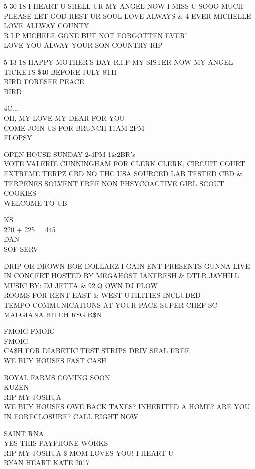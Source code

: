 \documentclass[10pt,letterpaper]{article}
\begin{document}
5{-}30{-}18 I HEART U SHELL UR MY ANGEL NOW I MISS U SOOO MUCH PLEASE LET GOD REST UR SOUL LOVE ALWAYS \& 4{-}EVER MICHELLE\\
LOVE ALLWAY COUNTY\\
R.I.P MICHELE GONE BUT NOT FORGOTTEN EVER!\\
LOVE YOU ALWAY YOUR SON COUNTRY RIP

5{-}13{-}18 HAPPY MOTHER'S DAY R.I.P MY SISTER NOW MY ANGEL\\
TICKETS \$40 BEFORE JULY 8TH\\
BIRD FORESEE PEACE\\
BIRD

4C...\\
OH, MY LOVE MY DEAR FOR YOU\\
COME JOIN US FOR BRUNCH 11AM{-}2PM\\
FLOPSY

OPEN HOUSE SUNDAY 2{-}4PM 1\&2BR's\\
VOTE VALERIE CUNNINGHAM FOR CLERK CLERK, CIRCUIT COURT\\
EXTREME TERPZ CBD NO THC USA SOURCED LAB TESTED CBD \& TERPENES SOLVENT FREE NON PHSYCOACTIVE GIRL SCOUT COOKIES\\
WELCOME TO UB

KS\\
220 + 225 = 445\\
DAN\\
SOF SERV

DRIP OR DROWN BOE DOLLARZ I GAIN ENT PRESENTS GUNNA LIVE IN CONCERT HOSTED BY MEGAHOST IANFRESH \& DTLR JAYHILL MUSIC BY: DJ JETTA \& 92.Q OWN DJ FLOW\\
ROOMS FOR RENT EAST \& WEST UTILITIES INCLUDED\\
TEMPO COMMUNICATIONS AT YOUR PACE SUPER CHEF SC\\
MALGIANA BITCH R\$G R\$N

FMOIG FMOIG\\
FMOIG\\
CA\$H FOR DIABETIC TEST STRIPS DRIV SEAL FREE\\
WE BUY HOUSES FAST CASH

ROYAL FARMS COMING SOON\\
KUZEN\\
RIP MY JOSHUA\\
WE BUY HOUSES OWE BACK TAXES?  INHERITED A HOME?  ARE YOU IN FORECLOSURE?  CALL RIGHT NOW

SAINT RNA\\
YES THIS PAYPHONE WORKS\\
RIP MY JOSHUA \$ MOM LOVES YOU!  I HEART U\\
RYAN HEART KATE 2017
\end{document}
